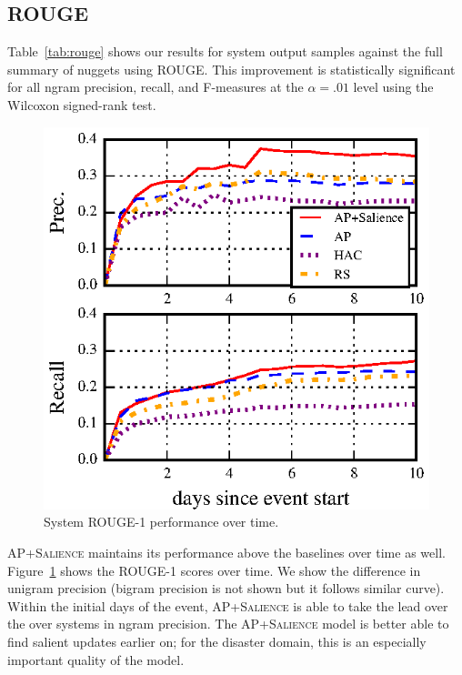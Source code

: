 \subsection{ROUGE}


Table~\ref{tab:rouge} shows our results for system output samples against the 
full summary of nuggets using ROUGE. This improvement is statistically 
significant for all ngram precision, recall, and F-measures at the 
$\alpha = .01$ level using the Wilcoxon signed-rank test. 


\begin{figure}
    \includegraphics[]{rouge-time.eps}
\caption{System ROUGE-1 performance over time.}
\label{fig:trouge}
\end{figure}


\textsc{AP+Salience} maintains its performance above the baselines over time 
as well. Figure~\ref{fig:trouge} shows the ROUGE-1 scores over time. We show 
the difference in unigram precision (bigram precision is not shown but it 
follows similar curve). Within the initial days of the event, 
\textsc{AP+Salience} is able to take the lead over the over systems in ngram 
precision. The \textsc{AP+Salience} model is better able to find salient 
updates earlier on; for the disaster domain, this is an especially important 
quality of the model. 



